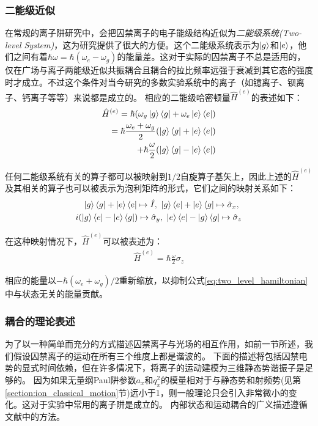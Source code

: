 \subsubsection[二能级近似]{二能级近似\label{section:two_level_approximation}}
在常规的离子阱研究中，会把囚禁离子的电子能级结构近似为\emph{二能级系统(Two-level System)}，这为研究提供了很大的方便。这个二能级系统表示为$\ket{g}$和$\ket{e}$，他们之间有着$\hbar \omega=\hbar(\omega_e-\omega_g)$的能量差。这对于实际的囚禁离子不总是适用的，仅在广场与离子两能级近似共振耦合且耦合的拉比频率远强于衰减到其它态的强度时才成立。不过这个条件对当今研究的多数实验系统中的离子（如镱离子、钡离子、钙离子等等）来说都是成立的。
相应的二能级哈密顿量$\hat{H}^{(e)}$的表述如下：
\begin{align}
    \hat{H}^{(e)}=\hbar(\omega_g\ket{g}\bra{g}+\omega_e\ket{e}\bra{e})\\
    =\hbar\frac{\omega_e+\omega_g}{2}(\ket{g}\bra{g}+\ket{e}\bra{e})\\
    +\hbar\frac{\omega}{2}(\ket{g}\bra{g}-\ket{e}\bra{e}) \label{eq:two_level_hamiltonian}
\end{align}

任何二能级系统有关的算子都可以被映射到$1/2$自旋算子基矢上，因此上述的$\hat{H}^{(e)}$及其相关的算子也可以被表示为泡利矩阵的形式，它们之间的映射关系如下：
\begin{align}
    \ket{g}\bra{g}+\ket{e}\bra{e}\mapsto \hat{I},\ \ket{g}\bra{e}+\ket{e}\bra{g}\mapsto \hat{\sigma}_x,\ \\
    i(\ket{g}\bra{e}-\ket{e}\bra{g})\mapsto \hat{\sigma}_y,\ \ket{e}\bra{e}-\ket{g}\bra{g}\mapsto \hat{\sigma}_z
\end{align}

在这种映射情况下，$\hat{H}^{(e)}$可以被表述为：
\begin{align}
    \hat{H}^{(e)}=\hbar\frac{\omega}{2}\sigma_z
\end{align}

相应的能量以$-\hbar(\omega_e+\omega_g)/2$重新缩放，以抑制公式\eqref{eq:two_level_hamiltonian}中与状态无关的能量贡献。

\subsubsection[耦合的理论表述]{耦合的理论表述\label{section:coupling_theory}}

为了以一种简单而充分的方式描述囚禁离子与光场的相互作用，如前一节所述，我们假设囚禁离子的运动在所有三个维度上都是谐波的。
下面的描述将包括囚禁电势的显式时间依赖，但在许多情况下，将离子的运动建模为三维静态势谐振子是足够的。
因为如果无量纲Paul阱参数$a_x$和$q_x^2$的模量相对于与静态势和射频势(见第\ref{section:ion_classical_motion}节)远小于1，则一般理论只会引入非常微小的变化。这对于实验中常用的离子阱是成立的。
内部状态和运动耦合的广义描述遵循文献\cite[]{Cirac_Garay_Blatt_Parkins_Zoller_2002,1996Paul}中的方法。

